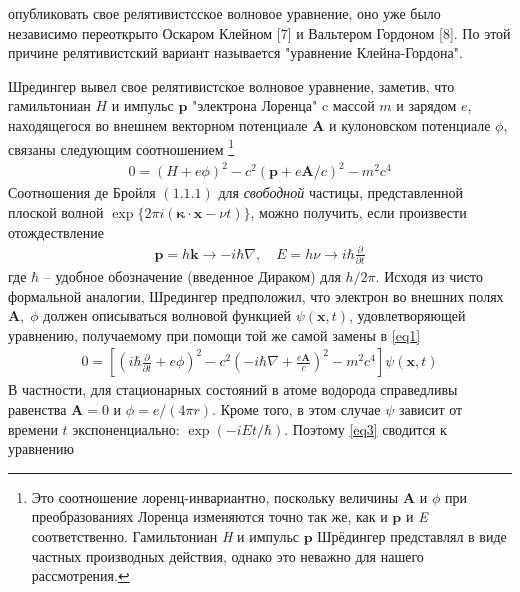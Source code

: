 \documentclass[a4paper,14pt]{article}
\theoremstyle{plain} %
\theoremstyle{definition} %
\theoremstyle{remark} %
\begin{document}
\newcommand{\anonsection}[1]{\section*{#1}\addcontentsline{toc}{part}{#1}}
\newcommand{\un}{\underline}
\newcommand{\ve}{\vec}

опубликовать свое релятивистсское волновое уравнение, оно уже было независимо переоткрыто Оскаром Клейном [7] и Вальтером Гордоном [8]. По этой причине релятивистский вариант называется "уравнение Клейна-Гордона".

Шредингер вывел свое релятивистское волновое уравнение, заметив, что гамильтониан $H$ и импульс $\mathbf{p}$ "электрона Лоренца" c массой $m$ и зарядом $e$, находящегося во внешнем векторном потенциале $\mathbf{A}$ и кулоновском потенциале $\phi$, связаны следующим соотношением \footnote[1]{Это соотношение лоренц-инвариантно, поскольку величины $\mathbf{A}$ и $\phi$ при преобразованиях Лоренца изменяются точно так же, как и $\mathbf{p}$ и \textit{E} соответственно. Гамильтониан \textit{H} и импульс $\mathbf{p}$ Шрёдингер представлял в виде частных производных действия, однако это неважно для нашего рассмотрения.}
\begin{align}\label{eq1}
0=(H+e\phi)^{2}-c^{2}(\mathbf{p}+e \mathbf{A} / c)^{2}-m^{2} c^{4}
\end{align}
Соотношения де Бройля $(1. 1.1)$ для \textit{свободной} частицы, представленной плоской волной $\exp \{2 \pi i(\boldsymbol{\kappa} \cdot \mathbf{x}-\nu t)\}$, можно получить, если произвести отождествление
\begin{align}\label{eq2}
\mathbf{p}=h \mathbf{k} \rightarrow-i \hbar \nabla, \quad E=h \nu \rightarrow i \hbar \frac{\partial}{\partial t}
\end{align}
где $\hbar$ -- удобное обозначение (введенное Дираком) для $h / 2 \pi .$ Исходя из чисто формальной аналогии, Шредингер предположил, что электрон во внешних полях $\mathbf{A}, \;\phi$ должен описываться волновой функцией $\psi(\mathbf{x}, t)$, удовлетворяющей уравнению, получаемому при помощи той же самой замены в \ref{eq1}
\begin{align}\label{eq3}
0=\left[\left(i \hbar \frac{\partial}{\partial t}+e \phi\right)^{2}-c^{2}\left(-i \hbar \nabla+\frac{e \mathbf{A}}{c}\right)^{2}-m^{2} c^{4}\right] \psi(\mathbf{x}, t)
\end{align}
В частности, для стационарных состояний в атоме водорода справедливы равенства $\mathbf{A}=0$ и $\phi=e /(4 \pi r) .$ Кроме того, в этом случае $\psi$ зависит от времени $t$ экспоненциально: $\exp (-i E t / \hbar) .$ Поэтому \ref{eq3} сводится к уравнению
\end{document}
